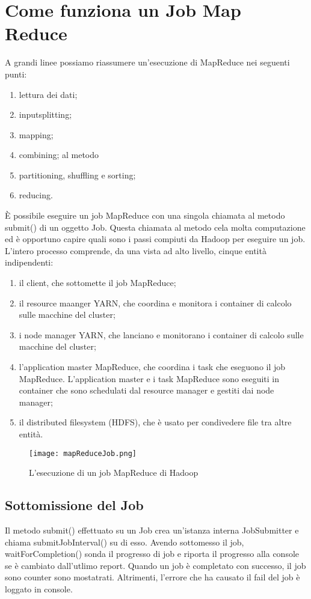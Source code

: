 \section{Come funziona un Job Map Reduce}
A grandi linee possiamo riassumere un'esecuzione di MapReduce nei seguenti punti:
\begin{enumerate}
  \item lettura dei dati;
  \item inputsplitting;
  \item mapping;
  \item combining; al metodo 
  \item partitioning, shuffling e sorting;
  \item reducing.
\end{enumerate}
È possibile eseguire un job MapReduce con una singola chiamata al metodo submit() di un oggetto Job. Questa chiamata al metodo cela molta computazione ed è opportuno capire quali sono i passi compiuti da Hadoop  per eseguire un job. \\
L'intero processo comprende, da una vista ad alto livello, cinque entità indipendenti:
\begin{enumerate}
  \item il client, che sottomette il job MapReduce;
  \item il resource maanger YARN, che coordina e monitora i container di calcolo sulle macchine del cluster;
  \item i node manager YARN, che lanciano e monitorano i container di calcolo sulle macchine del cluster;
  \item l'application master MapReduce, che coordina i task che eseguono il job MapReduce. L'application master e i task MapReduce sono eseguiti in container che sono schedulati dal resource manager e gestiti dai node manager;
  \item il distributed filesystem (HDFS), che è usato per condivedere file tra altre entità.
\end{enumerate}
\begin{figure}
  \begin{center}
    \texttt{[image: mapReduceJob.png]}
    \caption{L'esecuzione di un job MapReduce di Hadoop}
    \label{fig:job}
  \end{center}
\end{figure}
\subsection{Sottomissione del Job}
Il metodo submit() effettuato su un Job crea un'istanza interna JobSubmitter e chiama submitJobInterval() su di esso. Avendo sottomesso il job, waitForCompletion() sonda il progresso di job e riporta il progresso alla console se è cambiato dall'utlimo report. Quando un job è completato con successo, il job sono counter sono mostatrati. Altrimenti, l'errore che ha causato il fail del job è loggato in console.
